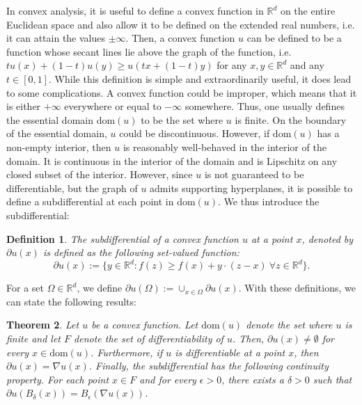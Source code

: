 \documentclass{amsart}
\newtheorem{theorem}{Theorem}
\theoremstyle{lemma}
\newtheorem{definition}[theorem]{Definition}
\theoremstyle{remark}
\begin{document}
In convex analysis, it is useful to define a convex function in $\mathbb{R}^d$ on the entire Euclidean space and also allow it to be defined on the extended real numbers, i.e. it can attain the values $\pm \infty$. Then, a convex function $u$ can be defined to be a function whose secant lines lie above the graph of the function, i.e. $tu(x) + (1-t)u(y) \geq u(tx + (1-t)y)$ for any $x, y \in \mathbb{R}^d$ and any $t \in [0,1]$. While this definition is simple and extraordinarily useful, it does lead to some complications. A convex function could be improper, which means that it is either $+\infty$ everywhere or equal to $-\infty$ somewhere. Thus, one usually defines the essential domain $\text{dom}(u)$ to be the set where $u$ is finite. On the boundary of the essential domain, $u$ could be discontinuous. However, if $\text{dom}(u)$ has a non-empty interior, then $u$ is reasonably well-behaved in the interior of the domain. It is continuous in the interior of the domain and is Lipschitz on any closed subset of the interior. However, since $u$ is not guaranteed to be differentiable, but the graph of $u$ admits supporting hyperplanes, it is possible to define a subdifferential at each point in $\text{dom}(u)$. We thus introduce the subdifferential:

\begin{definition}\label{def:subdifferential}
The subdifferential of a convex function $u$ at a point $x$, denoted by $\partial u(x)$ is defined as the following set-valued function:
\begin{equation}
\partial u(x) := \{y \in \mathbb{R}^d : f(z) \geq f(x) + y \cdot (z - x) \ \forall z \in \mathbb{R}^d\}.
\end{equation}
\end{definition}
For a set $\Omega \in \mathbb{R}^d$, we define $\partial u(\Omega) := \cup_{x \in \Omega} \partial u(x)$. With these definitions, we can state the following results:
\begin{theorem}
Let $u$ be a convex function. Let $\text{dom}(u)$ denote the set where $u$ is finite and let $F$ denote the set of differentiability of $u$. Then, $\partial u(x) \neq \emptyset$ for every $x \in \text{dom}(u)$. Furthermore, if $u$ is differentiable at a point $x$, then $\partial u(x) = \nabla u(x)$. Finally, the subdifferential has the following continuity property. For each point $x \in F$ and for every $\epsilon>0$, there exists a $\delta>0$ such that $\partial u (B_{\delta}(x)) = B_{\epsilon}(\nabla u(x))$.
\end{theorem}
\end{document}

